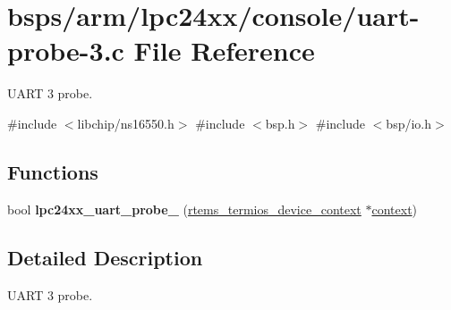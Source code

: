 \hypertarget{uart-probe-3_8c}{}\section{bsps/arm/lpc24xx/console/uart-\/probe-\/3.c File Reference}
\label{uart-probe-3_8c}


U\+A\+RT 3 probe.  


{\ttfamily \#include $<$libchip/ns16550.\+h$>$}\newline
{\ttfamily \#include $<$bsp.\+h$>$}\newline
{\ttfamily \#include $<$bsp/io.\+h$>$}\newline
\subsection*{Functions}
\begin{DoxyCompactItemize}
\item 
bool {\bfseries lpc24xx\+\_\+uart\+\_\+probe\+\_} (\mbox{\hyperlink{structrtems__termios__device__context}{rtems\+\_\+termios\+\_\+device\+\_\+context}} $\ast$\mbox{\hyperlink{sun4u_2tte_8h_a9b4a99475e2709333b8e5d70483173f1}{context}})
\end{DoxyCompactItemize}


\subsection{Detailed Description}
U\+A\+RT 3 probe. 

